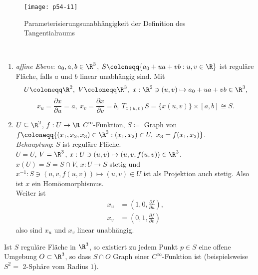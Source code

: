 \begin{figure}[H]
  \texttt{[image: p54-i1]}
  \caption{Parameterisierungsunabhängigkeit der Definition des Tangentialraums}
\end{figure}

\begin{example}
  \
  \begin{enumerate}
    \item \emph{affine Ebene}: $ a_0, a, b \in \R^3 $, $ S \coloneqq \{ a_0 + ua + vb : u,v \in \R \} $ ist reguläre Fläche, falls $ a $ und $ b $ linear unabhängig sind. Mit
    \begin{equation*}
      U \coloneqq \R^2, \ V \coloneqq \R^3, \ x: \R^2 \ni (u,v) \mapsto a_0 + ua + vb \in \R^3\text{,}
    \end{equation*}
    \begin{equation*}
      x_u  =\frac{\partial x}{\partial u} = a, \ x_v = \frac{\partial x}{\partial v} = b, \ T_{x(u,v)}S = \{ x(u,v) \} \times [a,b] \cong S\text{.}
    \end{equation*}

    \item $ U \subseteq \R^2 $, $ f: U \to \R $ $ C^\infty $-Funktion, $ S \coloneqq $ Graph von $ f \coloneqq \{ (x_1, x_2, x_3) \in \R^3 : (x_1, x_2) \in U, \ x_3 = f(x_1, x_2) \} $. \\
    \emph{Behauptung}: $ S $ ist reguläre Fläche. \\
    $ U = U $, $ V = \R^3 $, $ x : U \ni (u,v) \mapsto (u,v, f(u,v)) \in \R^3 $. \\
    $ x(U) = S = S \cap V $, $ x: U \to S $ stetig und $ x^{-1}: S \ni (u,v,f(u,v)) \mapsto (u,v) \in U $ ist als Projektion auch stetig. Also ist $ x $ ein Homöomorphismus. \\
    Weiter ist
    \begin{align*}
      x_u &= \left(1,0, \frac{\partial f}{\partial u}\right), \\
      x_v &= \left( 0,1, \frac{\partial f}{\partial v} \right)
    \end{align*}
    also sind $ x_u $ und $ x_v $ linear unabhängig.
  \end{enumerate}
\end{example}

\begin{remark}
  Ist $ S $ reguläre Fläche in $ \R^3 $, so existiert zu jedem Punkt $ p \in S $ eine offene Umgebung $ O \subset \R^3 $, so dass $ S \cap O $ Graph einer $ C^\infty $-Funktion ist (beispielsweise $ S^2 = $ 2-Sphäre vom Radius $ 1 $).
\end{remark}


